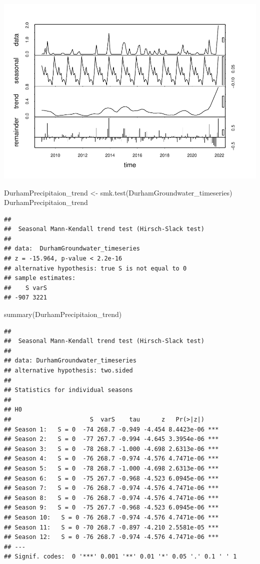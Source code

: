 \documentclass[
  12pt,
]{article}
\newenvironment{Shaded}{\begin{snugshade}}{\end{snugshade}}
\newcommand{\FunctionTok}[1]{\textcolor[rgb]{0.00,0.00,0.00}{#1}}
\newcommand{\NormalTok}[1]{#1}
\newcommand{\OtherTok}[1]{\textcolor[rgb]{0.56,0.35,0.01}{#1}}
\begin{document}
\includegraphics{Project_files/figure-latex/time-series analysis on precipitation-1.pdf}

\begin{Shaded}
\begin{Highlighting}[]
\NormalTok{DurhamPrecipitaion\_trend }\OtherTok{\textless{}{-}} \FunctionTok{smk.test}\NormalTok{(DurhamGroundwater\_timeseries)}
\NormalTok{DurhamPrecipitaion\_trend}
\end{Highlighting}
\end{Shaded}

\begin{verbatim}
## 
##  Seasonal Mann-Kendall trend test (Hirsch-Slack test)
## 
## data:  DurhamGroundwater_timeseries
## z = -15.964, p-value < 2.2e-16
## alternative hypothesis: true S is not equal to 0
## sample estimates:
##    S varS 
## -907 3221
\end{verbatim}

\begin{Shaded}
\begin{Highlighting}[]
\FunctionTok{summary}\NormalTok{(DurhamPrecipitaion\_trend)}
\end{Highlighting}
\end{Shaded}

\begin{verbatim}
## 
##  Seasonal Mann-Kendall trend test (Hirsch-Slack test)
## 
## data: DurhamGroundwater_timeseries
## alternative hypothesis: two.sided
## 
## Statistics for individual seasons
## 
## H0
##                      S  varS    tau      z   Pr(>|z|)    
## Season 1:   S = 0  -74 268.7 -0.949 -4.454 8.4423e-06 ***
## Season 2:   S = 0  -77 267.7 -0.994 -4.645 3.3954e-06 ***
## Season 3:   S = 0  -78 268.7 -1.000 -4.698 2.6313e-06 ***
## Season 4:   S = 0  -76 268.7 -0.974 -4.576 4.7471e-06 ***
## Season 5:   S = 0  -78 268.7 -1.000 -4.698 2.6313e-06 ***
## Season 6:   S = 0  -75 267.7 -0.968 -4.523 6.0945e-06 ***
## Season 7:   S = 0  -76 268.7 -0.974 -4.576 4.7471e-06 ***
## Season 8:   S = 0  -76 268.7 -0.974 -4.576 4.7471e-06 ***
## Season 9:   S = 0  -75 267.7 -0.968 -4.523 6.0945e-06 ***
## Season 10:   S = 0 -76 268.7 -0.974 -4.576 4.7471e-06 ***
## Season 11:   S = 0 -70 268.7 -0.897 -4.210 2.5581e-05 ***
## Season 12:   S = 0 -76 268.7 -0.974 -4.576 4.7471e-06 ***
## ---
## Signif. codes:  0 '***' 0.001 '**' 0.01 '*' 0.05 '.' 0.1 ' ' 1
\end{verbatim}
\end{document}
